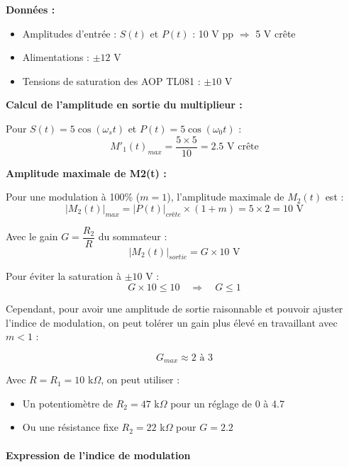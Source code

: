 \documentclass[11pt,a4paper]{article}
\begin{document}
\textbf{Données :}
\begin{itemize}
    \item Amplitudes d'entrée : $S(t)$ et $P(t)$ : 10 V pp $\Rightarrow$ 5 V crête
    \item Alimentations : $\pm 12$ V
    \item Tensions de saturation des AOP TL081 : $\pm 10$ V
\end{itemize}

\textbf{Calcul de l'amplitude en sortie du multiplieur :}

Pour $S(t) = 5\cos(\omega_s t)$ et $P(t) = 5\cos(\omega_0 t)$ :
\begin{equation}
M'_1(t)_{max} = \frac{5 \times 5}{10} = 2.5 \text{ V crête}
\end{equation}

\textbf{Amplitude maximale de M2(t) :}

Pour une modulation à 100\% ($m = 1$), l'amplitude maximale de $M_2(t)$ est :
\begin{equation}
|M_2(t)|_{max} = |P(t)|_{crête} \times (1 + m) = 5 \times 2 = 10 \text{ V}
\end{equation}

Avec le gain $G = \dfrac{R_2}{R}$ du sommateur :
\begin{equation}
|M_2(t)|_{sortie} = G \times 10 \text{ V}
\end{equation}

Pour éviter la saturation à $\pm 10$ V :
\begin{equation}
G \times 10 \leq 10 \quad \Rightarrow \quad G \leq 1
\end{equation}

Cependant, pour avoir une amplitude de sortie raisonnable et pouvoir ajuster l'indice de modulation, on peut tolérer un gain plus élevé en travaillant avec $m < 1$ :

\begin{equation}
\boxed{G_{max} \approx 2 \text{ à } 3}
\end{equation}

Avec $R = R_1 = 10$ k$\Omega$, on peut utiliser :
\begin{itemize}
    \item Un potentiomètre de $R_2 = 47$ k$\Omega$ pour un réglage de 0 à 4.7
    \item Ou une résistance fixe $R_2 = 22$ k$\Omega$ pour $G = 2.2$
\end{itemize}

\paragraph{Expression de l'indice de modulation}
\end{document}
